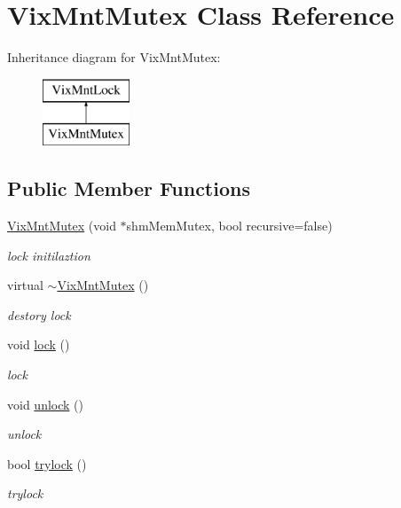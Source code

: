 \hypertarget{class_vix_mnt_mutex}{}\section{Vix\+Mnt\+Mutex Class Reference}
\label{class_vix_mnt_mutex}
Inheritance diagram for Vix\+Mnt\+Mutex\+:\begin{figure}[H]
\begin{center}
\leavevmode
\includegraphics[height=2.000000cm]{class_vix_mnt_mutex}
\end{center}
\end{figure}
\subsection*{Public Member Functions}
\begin{DoxyCompactItemize}
\item 
\hyperlink{class_vix_mnt_mutex_a165a9795c259086b0f2fe7786dcfb463}{Vix\+Mnt\+Mutex} (void $\ast$shm\+Mem\+Mutex, bool recursive=false)
\begin{DoxyCompactList}\small\item\em lock initilaztion \end{DoxyCompactList}\item 
\hypertarget{class_vix_mnt_mutex_a4a68406a46edd20401ce28893242dd58}{}\label{class_vix_mnt_mutex_a4a68406a46edd20401ce28893242dd58} 
virtual \hyperlink{class_vix_mnt_mutex_a4a68406a46edd20401ce28893242dd58}{$\sim$\+Vix\+Mnt\+Mutex} ()
\begin{DoxyCompactList}\small\item\em destory lock \end{DoxyCompactList}\item 
\hypertarget{class_vix_mnt_mutex_ab022b5ac82cfa609a7183be31ab0bcea}{}\label{class_vix_mnt_mutex_ab022b5ac82cfa609a7183be31ab0bcea} 
void \hyperlink{class_vix_mnt_mutex_ab022b5ac82cfa609a7183be31ab0bcea}{lock} ()
\begin{DoxyCompactList}\small\item\em lock \end{DoxyCompactList}\item 
\hypertarget{class_vix_mnt_mutex_aadb8aebc8fc6be2d55373fc101a034f9}{}\label{class_vix_mnt_mutex_aadb8aebc8fc6be2d55373fc101a034f9} 
void \hyperlink{class_vix_mnt_mutex_aadb8aebc8fc6be2d55373fc101a034f9}{unlock} ()
\begin{DoxyCompactList}\small\item\em unlock \end{DoxyCompactList}\item 
bool \hyperlink{class_vix_mnt_mutex_a549c576daa2a99a87b78c5387cab8d92}{trylock} ()
\begin{DoxyCompactList}\small\item\em trylock \end{DoxyCompactList}\end{DoxyCompactItemize}


